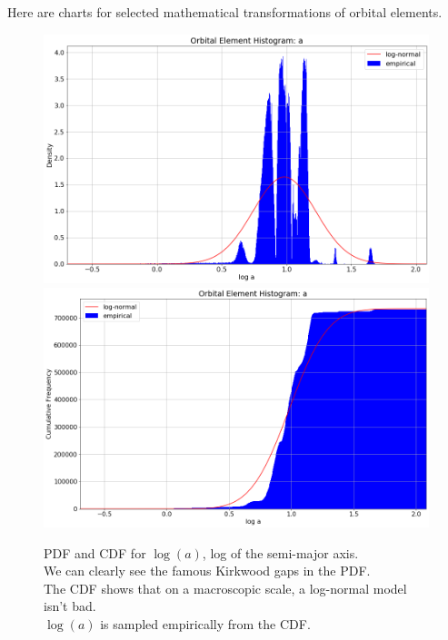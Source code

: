 Here are charts for selected mathematical transformations of orbital elements.
\begin{figure}[hbt!]
\begin{center}
\includegraphics[width=1.0\textwidth]{../figs/elts/elt_hist_a_pdf.png}
\includegraphics[width=1.0\textwidth]{../figs/elts/elt_hist_a_cdf.png}
\caption{PDF and CDF for $\log(a)$, log of the semi-major axis.\\
We can clearly see the famous Kirkwood gaps in the PDF. \\
The CDF shows that on a macroscopic scale, a log-normal model isn't bad.\\
$\log(a)$ is sampled empirically from the CDF.}
\end{center}
\end{figure}
\clearpage

